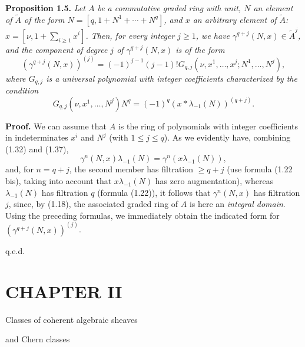 \textbf{Proposition 1.5.} \emph{Let $A$ be a commutative graded ring with unit, $N$ an element of $\widetilde A$ of the form $N=[q,1+N^1+\cdots+N^q]$, and $x$ an arbitrary element of $\widetilde A$: $x=[\nu,1+\sum_{i\geq1}x^i]$. Then, for every integer $j\geq1$, we have $\gamma^{q+j}(N,x)\in\widetilde A^j$, and the component of degree $j$ of $\gamma^{q+j}(N,x)$ is of the form}
\begin{equation}\tag{1.38}
\left(\gamma^{q+j}(N,x)\right)^{(j)}=(-1)^{j-1}(j-1)!G_{q,j}(\nu,x^1,\ldots,x^j;N^1,\ldots,N^j),
\end{equation}
\emph{where $G_{q,j}$ is a universal polynomial with integer coefficients characterized by the condition}
\begin{equation}\tag{1.39}
G_{q,j}(\nu,x^1,\ldots,N^j)N^q=(-1)^q(x*\lambda_{-1}(N))^{(q+j)}.
\end{equation}

\textbf{Proof.} We can assume that $A$ is the ring of polynomials with integer coefficients in indeterminates $x^i$ and $N^j$ (with $1\leq j\leq q$). As we evidently have, combining (1.32) and (1.37),
\begin{equation}\tag{1.40}
\gamma^n(N,x)\lambda_{-1}(N)=\gamma^n(x\lambda_{-1}(N)),
\end{equation}
and, for $n=q+j$, the second member has filtration $\geq q+j$ (use formula (1.22 bis), taking into account that $x\lambda_{-1}(N)$ has
%
zero augmentation), whereas $\lambda_{-1}(N)$ has filtration $q$ (formula (1.22)), it follows that $\gamma^n(N,x)$ has filtration $j$, since, by (1.18), the associated graded ring of $A$ is here an \emph{integral domain}. Using the preceding formulas, we immediately obtain the indicated form for $(\gamma^{q+j}(N,x))^{(j)}$.
\begin{flushright}q.e.d.\end{flushright}

\section*{CHAPTER II}
\begin{center}
Classes of coherent algebraic sheaves\par
and Chern classes
\end{center}

